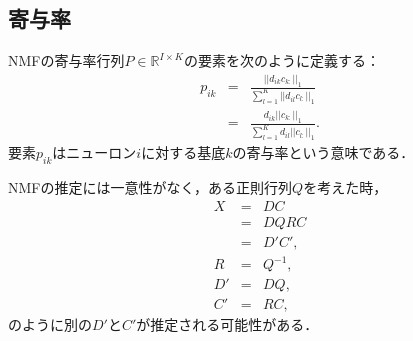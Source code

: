 \subsection{寄与率}
NMFの寄与率行列$P \in \mathbb{R}^{I \times K}$の要素を次のように定義する：
\begin{eqnarray}
	p_{ik} &=& \frac{||d_{ik} c_{k:}||_1}{\sum_{l=1}^K || d_{il} c_{l:} ||_1} \\
	&=& \frac{d_{ik} || c_{k:} ||_1}{ \sum_{l=1}^K d_{il} || c_{l:} ||_1 }.
\end{eqnarray}
要素$p_{ik}$はニューロン$i$に対する基底$k$の寄与率という意味である．

NMFの推定には一意性がなく，ある正則行列$Q$を考えた時，
\begin{eqnarray}
	X &=& DC \\
	&=& D Q R C \\
	&=& D'C', \\
	R &=& Q^{-1}, \\
	D' &=& DQ, \\
	C' &=& RC,
	\label{eq:dqrc}
\end{eqnarray}
のように別の$D'$と$C'$が推定される可能性がある．

